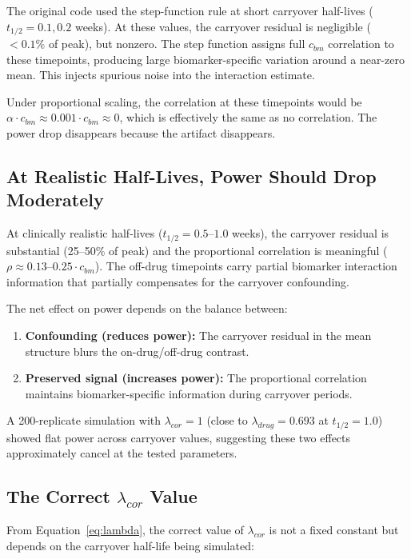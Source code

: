 \documentclass[11pt]{article}
\begin{document}
The original code used the step-function rule at short
carryover half-lives ($t_{1/2} = 0.1, 0.2$ weeks). At these
values, the carryover residual is negligible ($< 0.1\%$ of
peak), but nonzero. The step function assigns full $c_{bm}$
correlation to these timepoints, producing large
biomarker-specific variation around a near-zero mean. This
injects spurious noise into the interaction estimate.

Under proportional scaling, the correlation at these
timepoints would be $\alpha \cdot c_{bm} \approx 0.001
\cdot c_{bm} \approx 0$, which is effectively the same as
no correlation. The power drop disappears because the
artifact disappears.

\subsection{At Realistic Half-Lives, Power Should Drop
            Moderately}

At clinically realistic half-lives ($t_{1/2} = 0.5$--$1.0$
weeks), the carryover residual is substantial (25--50\% of
peak) and the proportional correlation is meaningful
($\rho \approx 0.13$--$0.25 \cdot c_{bm}$). The off-drug
timepoints carry partial biomarker interaction information
that partially compensates for the carryover confounding.

The net effect on power depends on the balance between:

\begin{enumerate}
\item \textbf{Confounding (reduces power):} The carryover
  residual in the mean structure blurs the on-drug/off-drug
  contrast.
\item \textbf{Preserved signal (increases power):} The
  proportional correlation maintains biomarker-specific
  information during carryover periods.
\end{enumerate}

A 200-replicate simulation with $\lambda_{cor} = 1$
(close to $\lambda_{drug} = 0.693$ at $t_{1/2} = 1.0$)
showed flat power across carryover values, suggesting these
two effects approximately cancel at the tested parameters.

\subsection{The Correct $\lambda_{cor}$ Value}

From Equation~\ref{eq:lambda}, the correct value of
$\lambda_{cor}$ is not a fixed constant but depends on the
carryover half-life being simulated:
\end{document}
